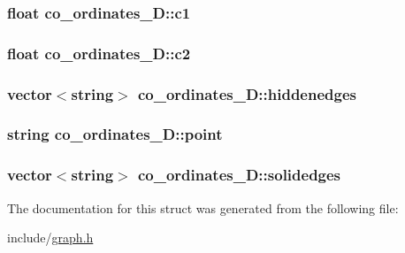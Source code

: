 \subsubsection[{\texorpdfstring{c1}{c1}}]{\setlength{\rightskip}{0pt plus 5cm}float co\+\_\+ordinates\+\_\+D\+::c1}\hypertarget{structco__ordinates__2D_a215c40478ad8333a7c0ab634a6bad587}{}\label{structco__ordinates__2D_a215c40478ad8333a7c0ab634a6bad587}
\subsubsection[{\texorpdfstring{c2}{c2}}]{\setlength{\rightskip}{0pt plus 5cm}float co\+\_\+ordinates\+\_\+D\+::c2}\hypertarget{structco__ordinates__2D_ab2320185357bf9635b33b98edb8087f1}{}\label{structco__ordinates__2D_ab2320185357bf9635b33b98edb8087f1}
\subsubsection[{\texorpdfstring{hiddenedges}{hiddenedges}}]{\setlength{\rightskip}{0pt plus 5cm}vector$<$string$>$ co\+\_\+ordinates\+\_\+D\+::hiddenedges}\hypertarget{structco__ordinates__2D_af5578efed44d03526239551b041aded4}{}\label{structco__ordinates__2D_af5578efed44d03526239551b041aded4}
\subsubsection[{\texorpdfstring{point}{point}}]{\setlength{\rightskip}{0pt plus 5cm}string co\+\_\+ordinates\+\_\+D\+::point}\hypertarget{structco__ordinates__2D_a670541bafcbb4094ed3423f655a66cf6}{}\label{structco__ordinates__2D_a670541bafcbb4094ed3423f655a66cf6}
\subsubsection[{\texorpdfstring{solidedges}{solidedges}}]{\setlength{\rightskip}{0pt plus 5cm}vector$<$string$>$ co\+\_\+ordinates\+\_\+D\+::solidedges}\hypertarget{structco__ordinates__2D_ab653d4ba438344c0564e74338b58d822}{}\label{structco__ordinates__2D_ab653d4ba438344c0564e74338b58d822}


The documentation for this struct was generated from the following file\+:\begin{DoxyCompactItemize}
\item 
include/\hyperlink{graph_8h}{graph.\+h}\end{DoxyCompactItemize}
